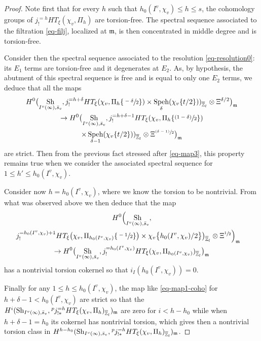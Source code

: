\documentclass[11pt]{article}
\newcommand{\psfrac}[2]{\sfrac{(#1)}{#2}}
\theoremstyle{plain}
\theoremstyle{definition}
\numberwithin{equation}{subsection}
\newcommand\Zm{{\mathbb Z}}
\newcommand{\lexp}[2]{\kern \scriptspace \vphantom{#2}^{#1}\kern-\scriptspace#2}
\DeclareMathOperator{\sh}{Sh}
\DeclareMathOperator{\speh}{Speh}
\let \oo=\infty
\begin{document}
\begin{proof}
Note first that for every $h$ such that $h_0(I^v,\chi_v) \leq h \leq s$, the cohomology groups of
$j^{=h}_! HT_\xi(\chi_{v},\Pi_h)$ are torsion-free.
The spectral sequence associated to the filtration
\eqref{eq-filj}, localized at $\mathfrak m$, is then concentrated in
middle degree and is torsion-free.

Consider then the spectral sequence associated to the resolution \eqref{eq-resolution0}: its
$E_1$ terms are torsion-free and it degenerates at $E_2$.
As, by hypothesis, the abutment of this spectral sequence is free
and is equal to only one $E_2$ terms, we deduce that all the maps
\begin{multline} \label{eq-map1-coho0}
H^0 \bigl (\sh_{I^{v}(\oo),\bar s_v},j_!^{=h+\delta} HT_\xi(\chi_{v},\Pi_h \{\sfrac{-\delta}{2}\}) \times
\speh_{\delta} (\chi_{v}\{t/2\}))_{\overline \Zm_l} \otimes \Xi^{\delta/2} \bigr)_{\mathfrak m}\\
\to H^0 \bigl (\sh_{I^{v}(\oo),\bar s_v},
j_!^{=h+\delta-1} HT_\xi(\chi_{v},\Pi_h \{\psfrac{1-\delta}{2}\}) \\ \times
\speh_{\delta-1}(\chi_{v}\{t/2\}))_{\overline \Zm_l} \otimes \Xi^{\psfrac{\delta-1}{2}} \bigr)_{\mathfrak m}
\end{multline}
are strict. Then from the previous fact stressed after \eqref{eq-map3}, this property
remains true when we consider the associated spectral sequence for $1 \leq h' \leq h_0(I^v,\chi_v)$.

Consider now $h=h_0(I^v,\chi_v)$,
where we know the torsion to be nontrivial. From what was observed above
we then deduce that the map
\begin{multline} \label{eq-map1-coho}
H^0 \Bigl (\sh_{I^{v}(\oo),\bar s_v},\\
\shoveright{j_!^{=h_0(I^v,\chi_v)+1} HT_\xi\bigl(\chi_{v},\Pi_{h_0(I^v,\chi_v)} \{\sfrac{-1}{2}\}\bigr)
\times \chi_{v}\bigl\{h_0(I^v,\chi_v)/2\bigl\}\bigr)_{\overline \Zm_l} \otimes \Xi^{\sfrac{1}{2}} \Bigr)_{\mathfrak m}} \\
\to H^0 \bigl (\sh_{I^{v}(\oo),\bar s_v},
j_!^{=h_0(I^v,\chi_v)} HT_\xi(\chi_{v},\Pi_{h_0(I^v,\chi_v)})_{\overline \Zm_l} \bigr)_{\mathfrak m}
\end{multline}
has a nontrivial torsion cokernel so that $i_I(h_0(I^v,\chi_v))=0$.

Finally for any $1 \leq h \leq h_0(I^v,\chi_v)$, the map like \eqref{eq-map1-coho} for $h+\delta-1 < h_0(I^v,\chi_v)$
are strict so that the $H^i(\sh_{I^{v}(\oo),\bar s_v},\lexp p j^{=h}_{!*}
HT_\xi(\chi_{v},\Pi_h)_{\overline \Zm_l})_{\mathfrak m}$ are zero for $i < h-h_0$ while when
$h+\delta-1=h_0$ its cokernel has nontrivial torsion, which gives
then a nontrivial torsion class in $H^{h-h_0}(\sh_{I^{v}(\oo),\bar s_v},\lexp p j^{=h}_{!*}
HT_\xi(\chi_{v},\Pi_h)_{\overline \Zm_l})_{\mathfrak m}$.
\end{proof}
\end{document}
